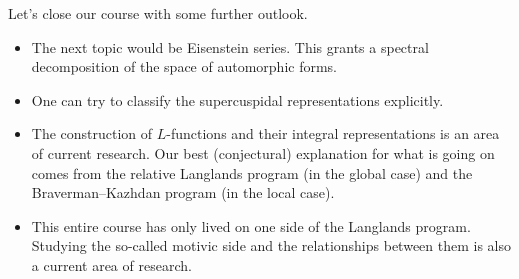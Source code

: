 \documentclass[../notes.tex]{subfiles}
\begin{document}
\begin{remark}
	Let's close our course with some further outlook.
	\begin{itemize}
		\item The next topic would be Eisenstein series. This grants a spectral decomposition of the space of automorphic forms.
		\item One can try to classify the supercuspidal representations explicitly.
		\item The construction of $L$-functions and their integral representations is an area of current research. Our best (conjectural) explanation for what is going on comes from the relative Langlands program (in the global case) and the Braverman--Kazhdan program (in the local case).
		\item This entire course has only lived on one side of the Langlands program. Studying the so-called motivic side and the relationships between them is also a current area of research.
	\end{itemize}
\end{remark}
\end{document}
